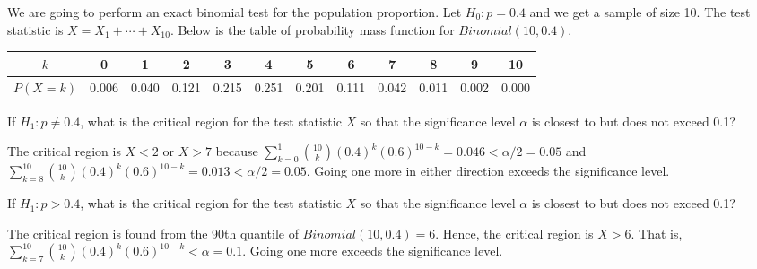 \documentclass{article}
\begin{document}
\begin{probset}
\begin{prob}
    We are going to perform an exact binomial test for the population proportion. Let $H_0: p = 0.4$ and we get a sample of size 10. The test statistic is $X = X_1 + \cdots + X_{10}$. Below is the table of probability mass function for $Binomial(10, 0.4)$.

    \begin{center}
        \begin{tabular}{c|c|c|c|c|c|c|c|c|c|c|c}
            \hline
            $k$ & 0 & 1 & 2 & 3 & 4 & 5 & 6 & 7 & 8 & 9 & 10 \\
            \hline
            $P(X = k)$ & 0.006 & 0.040 & 0.121 & 0.215 & 0.251 & 0.201 & 0.111 & 0.042 & 0.011 & 0.002 & 0.000 \\
            \hline
        \end{tabular}
    \end{center}

    \begin{subprobset}
    \begin{subprob}
        If $H_1: p \neq 0.4$, what is the critical region for the test statistic $X$ so that the significance level $\alpha$ is closest to but does not exceed 0.1?

        \begin{soln}
            The critical region is $X < 2$ or $X > 7$ because $\sum_{k=0}^{1} \binom{10}{k} (0.4)^k (0.6)^{10-k} = 0.046 < \alpha/2 = 0.05$ and $\sum_{k=8}^{10} \binom{10}{k} (0.4)^k (0.6)^{10-k} = 0.013 < \alpha/2 = 0.05$. Going one more in either direction exceeds the significance level.
        \end{soln}
    \end{subprob}

    \begin{subprob}
        If $H_1: p > 0.4$, what is the critical region for the test statistic $X$ so that the significance level $\alpha$ is closest to but does not exceed 0.1?

        \begin{soln}
            The critical region is found from the 90th quantile of $Binomial(10, 0.4) = 6$. Hence, the critical region is $X > 6$. That is, $\sum_{k=7}^{10} \binom{10}{k} (0.4)^k (0.6)^{10-k} < \alpha = 0.1$. Going one more exceeds the significance level.
        \end{soln}
    \end{subprob}
    \end{subprobset}
\end{prob}
\end{probset}
\end{document}
